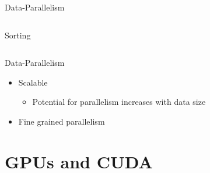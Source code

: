\documentclass[xcolor=dvipsnames]{beamer}
\begin{document}
\begin{frame}{Data-Parallelism}
\begin{columns}
\begin{column}{.48\textwidth}
  Sorting

  \end{column}
  
  \end{columns}

\end{frame}


\begin{frame}{Data-Parallelism}

  \begin{itemize} 
    \item Scalable
      \begin{itemize} 
        \item Potential for parallelism increases with data size 
      \end{itemize}
    \item Fine grained parallelism 
  \end{itemize} 

\end{frame}

%
\section{GPUs and CUDA}
\end{document}
